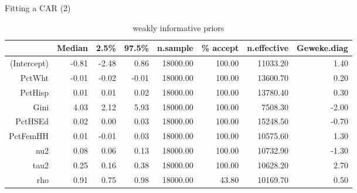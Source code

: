 \documentclass[aspectratio = 169, 12pt]{beamer}\usepackage[]{graphicx}\usepackage[]{color}
\begin{document}
\begin{frame}{Fitting a CAR (2)}
\begin{table}[ht]
\centering
\begin{tabular}{rrrrrrrr}
  \hline
 & Median & 2.5\% & 97.5\% & n.sample & \% accept & n.effective & Geweke.diag \\ 
  \hline
(Intercept) & -0.81 & -2.48 & 0.86 & 18000.00 & 100.00 & 11033.20 & 1.40 \\ 
  PctWht & -0.01 & -0.02 & -0.01 & 18000.00 & 100.00 & 13600.70 & 0.20 \\ 
  PctHisp & 0.01 & 0.01 & 0.02 & 18000.00 & 100.00 & 13780.40 & 0.30 \\ 
  Gini & 4.03 & 2.12 & 5.93 & 18000.00 & 100.00 & 7508.30 & -2.00 \\ 
  PctHSEd & 0.02 & 0.00 & 0.03 & 18000.00 & 100.00 & 15248.50 & -0.70 \\ 
  PctFemHH & 0.01 & -0.01 & 0.03 & 18000.00 & 100.00 & 10575.60 & 1.30 \\ 
  nu2 & 0.08 & 0.06 & 0.13 & 18000.00 & 100.00 & 10732.90 & -1.30 \\ 
  tau2 & 0.25 & 0.16 & 0.38 & 18000.00 & 100.00 & 10628.20 & 2.70 \\ 
  rho & 0.91 & 0.75 & 0.98 & 18000.00 & 43.80 & 10169.70 & 0.50 \\ 
   \hline
\end{tabular}
\caption{weakly informative priors} 
\end{table}

\end{frame}
\end{document}
